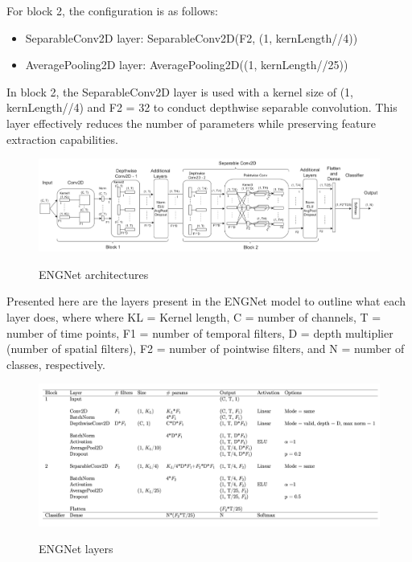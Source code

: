 \documentclass{Configuration_Files/PoliMi3i_thesis}
\begin{document}
For block 2, the configuration is as follows:
\begin{itemize}
\item SeparableConv2D layer: SeparableConv2D(F2, (1, kernLength//4))
\item AveragePooling2D layer: AveragePooling2D((1, kernLength//25))
\end{itemize}

In block 2, the SeparableConv2D layer is used with a kernel size of (1, kernLength//4) and F2 = 32 to conduct depthwise separable convolution. This layer effectively reduces the number of parameters while preserving feature extraction capabilities.

\begin{figure}[H]
	\includegraphics[scale=0.4]{engNet_arch.png}
	\centering
    \label{engNet_params_2}
    \caption{ENGNet architectures \cite{tesiDavide}}
\end{figure}

Presented here are the layers present in the ENGNet model to outline what each layer does, where where KL = Kernel length, C = number of channels, T = number of time points, F1 = number of temporal filters, D = depth multiplier (number of spatial filters), F2 = number of pointwise filters, and N = number of classes, respectively.


\begin{figure}[H]
	\includegraphics[scale=0.25]{engNet_layers.png}
	\centering
    \label{engNet_params_3}
    \caption{ENGNet layers \cite{tesiDavide}}
\end{figure}
\end{document}

